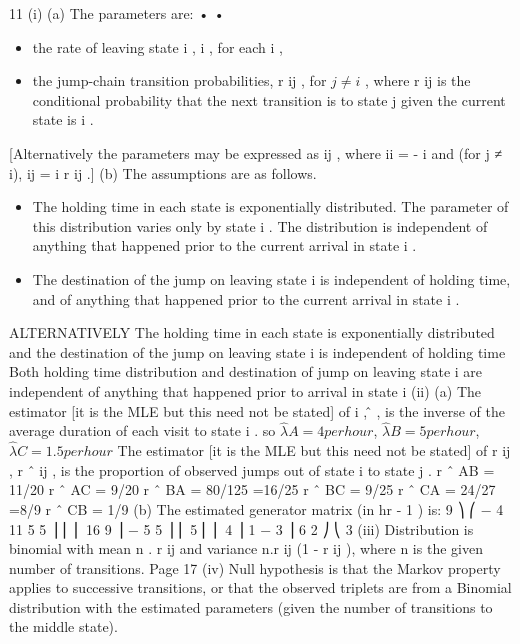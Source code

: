 \documentclass[a4paper,12pt]{article}
\begin{document}
\begin{enumerate}
11
(i)
(a)
The parameters are:
•
•
\begin{itemize}
\item the rate of leaving state i , \lambda i , for each i ,
\item the jump-chain transition probabilities, r ij , for $j \neq i$ , where r ij is the
conditional probability that the next transition is to state j given the
current state is i .
\end{itemize}
[Alternatively the parameters may be expressed as \sigma  ij , where \sigma  ii = - \lambda i
and (for j ≠ i), \sigma  ij = \lambda i r ij .]
(b)
The assumptions are as follows.
\begin{itemize}
\item The holding time in each state is exponentially distributed. The parameter of this distribution varies only by state i . The distribution is independent of anything that happened prior to the current arrival in state i .
\item The destination of the jump on leaving state i is independent of holding time, and of anything that happened prior to the current arrival in state i .
\end{itemize}
ALTERNATIVELY
The holding time in each state is exponentially distributed and the
destination of the jump on leaving state i is independent of holding
time
Both holding time distribution and destination of jump on leaving state
i are independent of anything that happened prior to arrival in state i
(ii)
(a)
The estimator [it is the MLE but this need not
be stated] of \lambda i , \lambdâ , is the inverse of the average duration of each visit
to state i .
so $\hat{\lambda} A = 4 per hour$, $\hat{\lambda} B = 5 per hour$, $\hat{\lambda} C = 1.5 per hour$
The estimator [it is the MLE but this need not be stated] of r ij , r ˆ ij , is
the proportion of observed jumps out of state i to state j .
r ˆ AB = 11/20
r ˆ AC = 9/20
r ˆ BA = 80/125 =16/25
r ˆ BC = 9/25
r ˆ CA = 24/27 =8/9
r ˆ CB = 1/9
(b)
The estimated generator matrix (in hr - 1 ) is:
9 ⎞
⎛ − 4 11
5
5 ⎟
⎜
⎜ 16
9 ⎟
− 5
5 ⎟
⎜ 5
⎜ ⎜ 4
⎟
1
− 3 ⎟
6
2 ⎠
⎝ 3
(iii)
Distribution is binomial with mean n . r ij and variance n.r ij
(1 - r ij ), where n is the given number of transitions.
Page 17%
(iv)
Null hypothesis is that the Markov property applies to successive transitions, or that the observed triplets are from a Binomial distribution with the estimated parameters (given the number of transitions to the middle state).

\end{enumerate}
\end{document}
